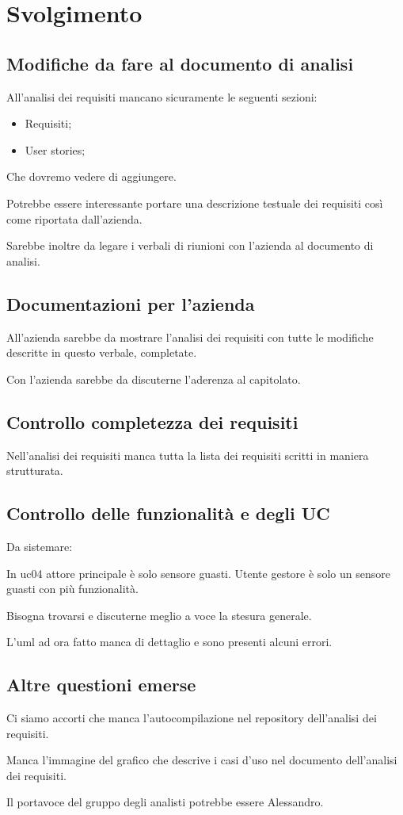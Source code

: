 \section{Svolgimento}

\subsection{Modifiche da fare al documento di analisi}

All'analisi dei requisiti mancano sicuramente le seguenti sezioni:
\begin{itemize}
    \item Requisiti;
    \item User stories;
\end{itemize}
Che dovremo vedere di aggiungere.

Potrebbe essere interessante portare una descrizione testuale dei requisiti così come riportata dall'azienda.

Sarebbe inoltre da legare i verbali di riunioni con l'azienda al documento di analisi.

\subsection{Documentazioni per l'azienda}

All'azienda sarebbe da mostrare l'analisi dei requisiti con tutte le modifiche descritte in questo verbale, completate.

Con l'azienda sarebbe da discuterne l'aderenza al capitolato.

\subsection{Controllo completezza dei requisiti}

Nell'analisi dei requisiti manca tutta la lista dei requisiti scritti in maniera strutturata.

\subsection{Controllo delle funzionalità e degli UC}

Da sistemare: 

In uc04 attore principale è solo sensore guasti. Utente gestore è solo un sensore guasti con più funzionalità.

Bisogna trovarsi e discuterne meglio a voce la stesura generale.

L'uml ad ora fatto manca di dettaglio e sono presenti alcuni errori.

\subsection{Altre questioni emerse}

Ci siamo accorti che manca l'autocompilazione nel repository dell'analisi dei requisiti.

Manca l'immagine del grafico che descrive i casi d'uso nel documento dell'analisi dei requisiti.

Il portavoce del gruppo degli analisti potrebbe essere Alessandro.

